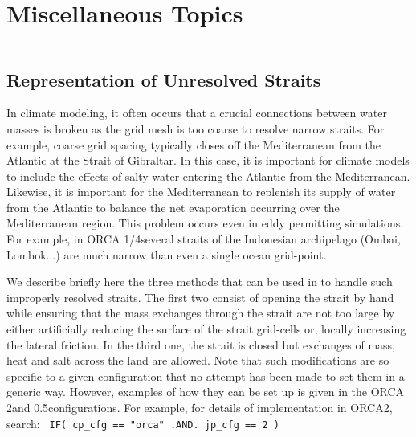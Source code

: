 \documentclass[NEMO_book]{subfiles}
\begin{document}
\chapter{Miscellaneous Topics}
\label{MISC}
\minitoc

\newpage
$\ $\newline    %

\section{Representation of Unresolved Straits}
\label{MISC_strait}

In climate modeling, it often occurs that a crucial connections between water masses
is broken as the grid mesh is too coarse to resolve narrow straits. For example, coarse 
grid spacing typically closes off the Mediterranean from the Atlantic at the Strait of 
Gibraltar. In this case, it is important for climate models to include the effects of salty 
water entering the Atlantic from the Mediterranean. Likewise, it is important for the 
Mediterranean to replenish its supply of water from the Atlantic to balance the net 
evaporation occurring over the Mediterranean region. This problem occurs even in 
eddy permitting simulations. For example, in ORCA 1/4\deg several straits of the Indonesian 
archipelago (Ombai, Lombok...) are much narrow than even a single ocean grid-point.

We describe briefly here the three methods that can be used in \NEMO to handle 
such improperly resolved straits. The first two consist of opening the strait by hand 
while ensuring that the mass exchanges through the strait are not too large by 
either artificially reducing the surface of the strait grid-cells or, locally increasing 
the lateral friction. In the third one, the strait is closed but exchanges of mass, 
heat and salt across the land are allowed.
Note that such modifications are so specific to a given configuration that no attempt 
has been made to set them in a generic way. However, examples of how 
they can be set up is given in the ORCA 2\deg and 0.5\deg configurations. For example, 
for details of implementation in ORCA2, search: 
\texttt{ IF( cp\_cfg == "orca" .AND. jp\_cfg == 2 ) }
\end{document}
